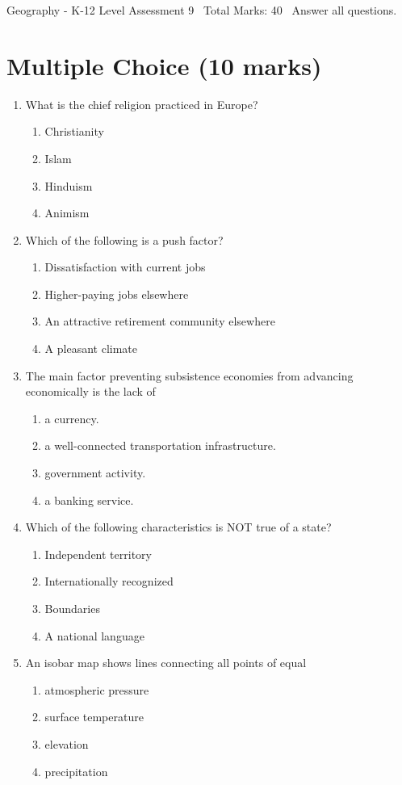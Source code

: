 \documentclass[12pt]{article}
\begin{document}
\begin{center}
Geography - K-12 Level Assessment 9 \
Total Marks: 40 \
Answer all questions.
\end{center}

\section*{Multiple Choice (10 marks)}
\begin{enumerate}[label=\arabic*.]
\item What is the chief religion practiced in Europe?
\begin{enumerate}[label=(\alph*)]
    \item Christianity
    \item Islam
    \item Hinduism
    \item Animism
\end{enumerate}
\item Which of the following is a push factor?
\begin{enumerate}[label=(\alph*)]
    \item Dissatisfaction with current jobs
    \item Higher-paying jobs elsewhere
    \item An attractive retirement community elsewhere
    \item A pleasant climate
\end{enumerate}
\item The main factor preventing subsistence economies from advancing economically is the lack of
\begin{enumerate}[label=(\alph*)]
    \item a currency.
    \item a well-connected transportation infrastructure.
    \item government activity.
    \item a banking service.
\end{enumerate}
\item Which of the following characteristics is NOT true of a state?
\begin{enumerate}[label=(\alph*)]
    \item Independent territory
    \item Internationally recognized
    \item Boundaries
    \item A national language
\end{enumerate}
\item An isobar map shows lines connecting all points of equal
\begin{enumerate}[label=(\alph*)]
    \item atmospheric pressure
    \item surface temperature
    \item elevation
    \item precipitation
\end{enumerate}
\end{enumerate}
\end{document}
